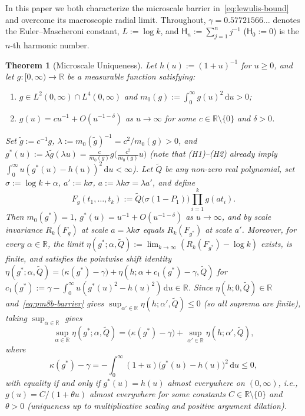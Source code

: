 \documentclass[11pt, reqno]{amsart}
\newtheorem{theorem}{Theorem}
\theoremstyle{remark}
\numberwithin{equation}{section}
\newcommand{\Harm}{\mathsf{H}}
\newcommand{\R}{\mathbb{R}}
\newcommand{\dd}{\,\mathrm{d}}
\begin{document}
In this paper we both characterize the microscale barrier in~\eqref{eq:lewulis-bound} and
overcome its macroscopic radial limit. Throughout, $\gamma = 0.57721566\dots$ denotes the
Euler--Mascheroni constant, $L := \log k$, and $\Harm_n := \sum_{j=1}^n j^{-1}$ ($\Harm_0 := 0$)
is the $n$-th harmonic number.

\begin{theorem}[Microscale Uniqueness]\label{thm:uniqueness}
Let $h(u) := (1+u)^{-1}$ for $u \ge 0$, and let $g \colon [0,\infty) \to \R$ be a
measurable function satisfying:
\begin{enumerate}
\item[(H1)] $g \in L^2(0,\infty) \cap L^4(0,\infty)$ and $m_0(g) := \int_0^\infty g(u)^2 \dd u > 0$;
\item[(H2)] $g(u) = c u^{-1} + O(u^{-1-\delta})$ as $u \to \infty$ for some $c \in \R \setminus \{0\}$ and $\delta > 0$.
\end{enumerate}
Set $\tilde{g} := c^{-1} g$, $\lambda := m_0(\tilde{g})^{-1} = c^2 / m_0(g) > 0$, and
$g^*(u) := \lambda \tilde{g}(\lambda u) = \frac{c}{m_0(g)} g\bigl(\frac{c^2}{m_0(g)} u\bigr)$
(note that (H1)--(H2) already imply $\int_0^\infty u (g^*(u) - h(u))^2 \dd u < \infty$). Let $\widetilde{Q}$ be any non-zero real polynomial, set
$\sigma := \log k + \alpha$, $a' := k\sigma$, $a := \lambda k\sigma = \lambda a'$, and define
\begin{equation}\label{eq:Fg-def}
F_g(t_1,\dots,t_k) := \widetilde{Q}\bigl(\sigma(1 - P_1)\bigr) \prod_{i=1}^k g(a t_i).
\end{equation}
Then $m_0(g^*) = 1$, $g^*(u) = u^{-1} + O(u^{-1-\delta})$ as $u \to \infty$, and by scale
invariance $R_k(F_g)$ at scale $a = \lambda k \sigma$ equals $R_k(F_{g^*})$ at scale $a'$.
Moreover, for every $\alpha \in \R$, the limit
$\eta(g^*; \alpha, \widetilde{Q}) := \lim_{k\to\infty}(R_k(F_{g^*}) - \log k)$ exists, is finite,
and satisfies the pointwise shift identity
$\eta(g^*; \alpha, \widetilde{Q}) = \bigl(\kappa(g^*) - \gamma\bigr) + \eta(h; \alpha + c_1(g^*) - \gamma, \widetilde{Q})$
for $c_1(g^*) := \gamma - \int_0^\infty u(g^*(u)^2 - h(u)^2)\dd u \in \R$. Since
$\eta(h; 0, \widetilde{Q}) \in \R$ and~\eqref{eq:pm8b-barrier} gives
$\sup_{\alpha'\in\R}\eta(h; \alpha', \widetilde{Q}) \le 0$ (so all suprema are finite), taking
$\sup_{\alpha\in\R}$ gives
\begin{equation}\label{eq:shift-covariance}
\sup_{\alpha \in \R} \eta(g^*; \alpha, \widetilde{Q})
= \bigl(\kappa(g^*) - \gamma\bigr) + \sup_{\alpha' \in \R} \eta(h; \alpha', \widetilde{Q}),
\end{equation}
where
\begin{equation}\label{eq:kappa-penalty}
\kappa(g^*) - \gamma
= -\int_0^\infty (1+u)\bigl(g^*(u) - h(u)\bigr)^2 \dd u \le 0,
\end{equation}
with equality if and only if $g^*(u) = h(u)$ almost everywhere on $(0,\infty)$, i.e.,
$g(u) = C/(1 + \theta u)$ almost everywhere for some constants $C \in \R \setminus \{0\}$
and $\theta > 0$ (uniqueness up to multiplicative scaling and positive argument dilation).
\end{theorem}
\end{document}
